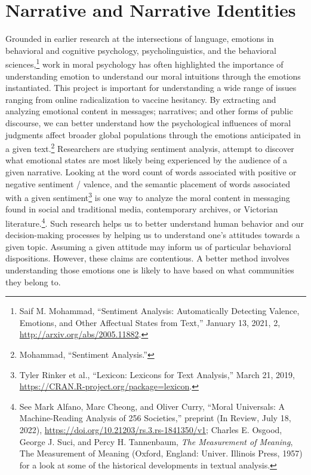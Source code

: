 \documentclass[phdthesis,12pt,final,a4paper]{wuthesis}
\theoremstyle{definition}
\theoremstyle{definition}
\theoremstyle{definition}
\theoremstyle{definition}
\theoremstyle{remark}
\begin{document}
\section{Narrative and Narrative Identities}\label{narrative-and-narrative-identities}

Grounded in earlier research at the intersections of language, emotions in behavioral and cognitive psychology, psycholinguistics, and the behavioral sciences,\footnote{Saif M. Mohammad, {``Sentiment {Analysis}: {Automatically Detecting Valence}, {Emotions}, and {Other Affectual States} from {Text},''} January 13, 2021, 2, \url{http://arxiv.org/abs/2005.11882}.} work in moral psychology has often highlighted the importance of understanding emotion to understand our moral intuitions through the emotions instantiated. This project is important for understanding a wide range of issues ranging from online radicalization to vaccine hesitancy. By extracting and analyzing emotional content in messages; narratives; and other forms of public discourse, we can better understand how the psychological influences of moral judgments affect broader global populations through the emotions anticipated in a given text.\footnote{Mohammad, {``Sentiment {Analysis}.''}} Researchers are studying sentiment analysis, attempt to discover what emotional states are most likely being experienced by the audience of a given narrative. Looking at the word count of words associated with positive or negative sentiment / valence, and the semantic placement of words associated with a given sentiment\footnote{Tyler Rinker et al., {``Lexicon: {Lexicons} for {Text Analysis},''} March 21, 2019, \url{https://CRAN.R-project.org/package=lexicon}.} is one way to analyze the moral content in messaging found in social and traditional media, contemporary archives, or Victorian literature.\footnote{See Mark Alfano, Marc Cheong, and Oliver Curry, {``Moral {Universals}: {A} Machine-Reading Analysis of 256 Societies,''} preprint (In Review, July 18, 2022), \url{https://doi.org/10.21203/rs.3.rs-1841350/v1}; Charles E. Osgood, George J. Suci, and Percy H. Tannenbaum, \emph{The Measurement of Meaning}, The Measurement of Meaning (Oxford, England: Univer. Illinois Press, 1957) for a look at some of the historical developments in textual analysis.}. Such research helps us to better understand human behavior and our decision-making processes by helping us to understand one's attitudes towards a given topic. Assuming a given attitude may inform us of particular behavioral dispositions. However, these claims are contentious. A better method involves understanding those emotions one is likely to have based on what communities they belong to.
\end{document}
